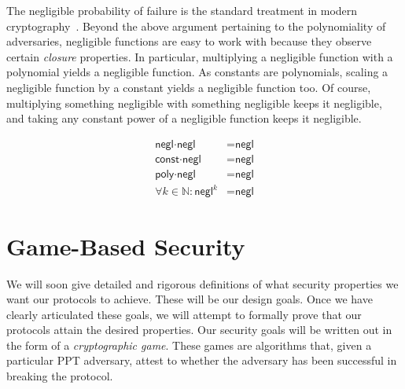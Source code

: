 The negligible probability of failure is the standard treatment in modern cryptography~\cite{katz}.
Beyond the above argument pertaining to the polynomiality of adversaries, negligible
functions are easy to work with because they observe certain \emph{closure} properties.
In particular, multiplying a negligible function with a polynomial yields a negligible
function. As constants are polynomials, scaling a negligible function by a constant
yields a negligible function too. Of course, multiplying something negligible with
something negligible keeps it negligible, and taking any constant power of a negligible function
keeps it negligible.

\begin{align*}
  \textsf{negl} \cdot \textsf{negl} &= \textsf{negl}\\
  \textsf{const} \cdot \textsf{negl} &= \textsf{negl}\\
  \textsf{poly} \cdot \textsf{negl} &= \textsf{negl}\\
  \forall k \in \mathbb{N}: \textsf{negl}^k &= \textsf{negl}
\end{align*}

\section{Game-Based Security}

We will soon give detailed and rigorous definitions of what security properties we want
our protocols to achieve. These will be our design goals. Once we have clearly articulated
these goals, we will attempt to formally prove that our protocols attain the desired properties.
Our security goals will be written out in the form of a \emph{cryptographic game}. These
games are algorithms that, given a particular PPT adversary, attest to whether the adversary
has been successful in breaking the protocol.

